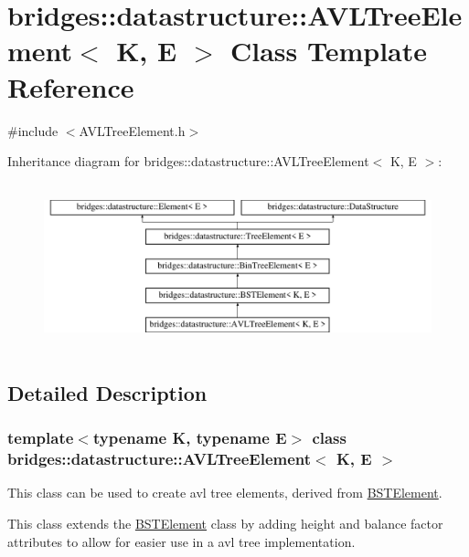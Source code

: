 \hypertarget{classbridges_1_1datastructure_1_1_a_v_l_tree_element}{}\section{bridges\+:\+:datastructure\+:\+:A\+V\+L\+Tree\+Element$<$ K, E $>$ Class Template Reference}
\label{classbridges_1_1datastructure_1_1_a_v_l_tree_element}


{\ttfamily \#include $<$A\+V\+L\+Tree\+Element.\+h$>$}

Inheritance diagram for bridges\+:\+:datastructure\+:\+:A\+V\+L\+Tree\+Element$<$ K, E $>$\+:\begin{figure}[H]
\begin{center}
\leavevmode
\includegraphics[height=4.794520cm]{classbridges_1_1datastructure_1_1_a_v_l_tree_element}
\end{center}
\end{figure}


\subsection{Detailed Description}
\subsubsection*{template$<$typename K, typename E$>$\newline
class bridges\+::datastructure\+::\+A\+V\+L\+Tree\+Element$<$ K, E $>$}

This class can be used to create avl tree elements, derived from \mbox{\hyperlink{classbridges_1_1datastructure_1_1_b_s_t_element}{B\+S\+T\+Element}}. 

This class extends the \mbox{\hyperlink{classbridges_1_1datastructure_1_1_b_s_t_element}{B\+S\+T\+Element}} class by adding height and balance factor attributes to allow for easier use in a avl tree implementation.

